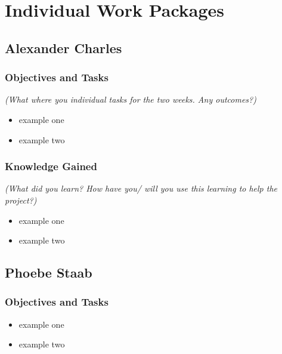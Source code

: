 \hypertarget{individual-work-packages}{%
\section{Individual Work Packages}\label{individual-work-packages}}

\hypertarget{alexander-charles}{%
\subsection{Alexander Charles}\label{alexander-charles}}

\hypertarget{objectives-and-tasks}{%
\subsubsection{Objectives and Tasks}\label{objectives-and-tasks}}

\emph{(What where you individual tasks for the two weeks. Any
outcomes?)}

\begin{itemize}
\tightlist
\item
  example one
\item
  example two
\end{itemize}

\hypertarget{knowledge-gained}{%
\subsubsection{Knowledge Gained}\label{knowledge-gained}}

\emph{(What did you learn? How have you/ will you use this learning to
help the project?)}

\begin{itemize}
\tightlist
\item
  example one
\item
  example two
\end{itemize}

\hypertarget{phoebe-staab}{%
\subsection{Phoebe Staab}\label{phoebe-staab}}

\hypertarget{objectives-and-tasks-1}{%
\subsubsection{Objectives and Tasks}\label{objectives-and-tasks-1}}

\begin{itemize}
\tightlist
\item
  example one
\item
  example two
\end{itemize}

